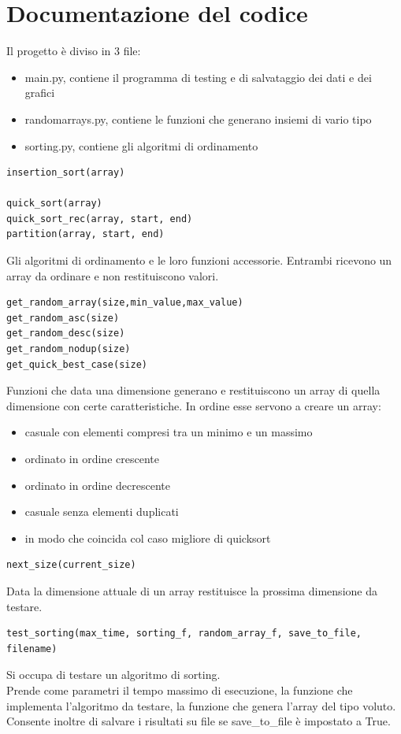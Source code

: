 \documentclass[]{article}
\begin{document}
\section{Documentazione del codice}
Il progetto è diviso in 3 file:
\begin{itemize}
\item main.py, contiene il programma di testing e di salvataggio dei dati e dei grafici
\item randomarrays.py, contiene le funzioni che generano insiemi di vario tipo
\item sorting.py, contiene gli algoritmi di ordinamento
\end{itemize}
\begin{verbatim}
insertion_sort(array)

quick_sort(array)
quick_sort_rec(array, start, end)
partition(array, start, end)
\end{verbatim}
Gli algoritmi di ordinamento e le loro funzioni accessorie. Entrambi ricevono un array da ordinare e non restituiscono valori.
\begin{verbatim}
get_random_array(size,min_value,max_value)
get_random_asc(size)
get_random_desc(size)
get_random_nodup(size)
get_quick_best_case(size)
\end{verbatim}
Funzioni che data una dimensione generano e restituiscono un array di quella dimensione con certe caratteristiche. In ordine esse servono a creare un array:
\begin{itemize}
\item casuale con elementi compresi tra un minimo e un massimo
\item ordinato in ordine crescente
\item ordinato in ordine decrescente
\item casuale senza elementi duplicati
\item in modo che coincida col caso migliore di quicksort
\end{itemize}
\begin{verbatim}
next_size(current_size)
\end{verbatim}
Data la dimensione attuale di un array restituisce la prossima dimensione da testare.
\begin{verbatim}
test_sorting(max_time, sorting_f, random_array_f, save_to_file, filename)
\end{verbatim}
Si occupa di testare un algoritmo di sorting.\\
Prende come parametri il tempo massimo di esecuzione, la funzione che implementa l'algoritmo da testare, la funzione che genera l'array del tipo voluto. Consente inoltre di salvare i risultati su file se save\_to\_file è impostato a True.\\
\end{document}
